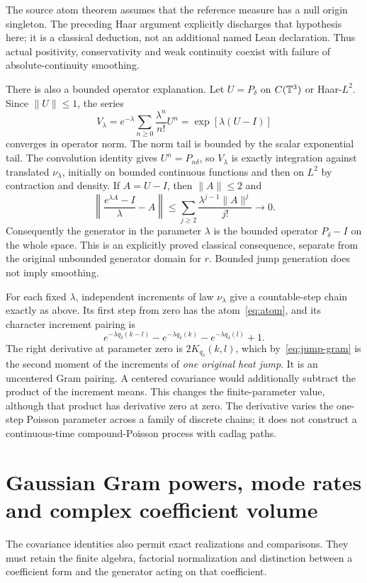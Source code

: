 \documentclass[11pt]{article}
\theoremstyle{remark}\newtheorem{remark}[theorem]{Remark}
\begin{document}
The source atom theorem assumes that the reference measure has a null
origin singleton. The preceding Haar argument explicitly discharges
that hypothesis here; it is a classical deduction, not an additional
named Lean declaration. Thus actual positivity, conservativity and
weak continuity coexist with failure of absolute-continuity smoothing.

There is also a bounded operator explanation. Let $U=P_\delta$ on
$C(\mathbb T^3)$ or Haar-$L^2$. Since $\|U\|\leq1$, the series
\[
 V_\lambda=e^{-\lambda}\sum_{n\geq0}\frac{\lambda^n}{n!}U^n
             =\exp[\lambda(U-I)]
\]
converges in operator norm. The norm tail is bounded by the scalar
exponential tail. The convolution identity gives $U^n=P_{n\delta}$,
so $V_\lambda$ is exactly integration against translated
$\nu_\lambda$, initially on bounded continuous functions and then on
$L^2$ by contraction and density. If $A=U-I$, then $\|A\|\leq2$ and
\[
 \left\|\frac{e^{\lambda A}-I}{\lambda}-A\right\|
 \leq\sum_{j\geq2}\frac{\lambda^{j-1}\|A\|^j}{j!}\longrightarrow0.
\]
Consequently the generator in the parameter $\lambda$ is the bounded
operator $P_\delta-I$ on the whole space. This is an explicitly proved
classical consequence, separate from the original unbounded generator
domain for $r$. Bounded jump generation does not imply smoothing.

For each fixed $\lambda$, independent increments of law $\nu_\lambda$
give a countable-step chain exactly as above. Its first step from zero
has the atom~\eqref{eq:atom}, and its character increment pairing is
\[
 e^{-\lambda q_\delta(k-l)}-e^{-\lambda q_\delta(k)}
       -e^{-\lambda q_\delta(l)}+1.
\]
The right derivative at parameter zero is
$2K_{q_\delta}(k,l)$, which by~\eqref{eq:jump-gram} is the second
moment of the increments of \emph{one original heat jump}. It is
an uncentered Gram pairing. A centered covariance would additionally
subtract the product of the increment means. This changes the
finite-parameter value, although that product has derivative zero at
zero. The derivative varies the one-step Poisson parameter across a
family of discrete chains; it does not construct a continuous-time
compound-Poisson process with cadlag paths.


\section{Gaussian Gram powers, mode rates and complex coefficient volume}
The covariance identities also permit exact realizations and comparisons.
They must retain the finite algebra, factorial normalization and distinction
between a coefficient form and the generator acting on that coefficient.
\end{document}
